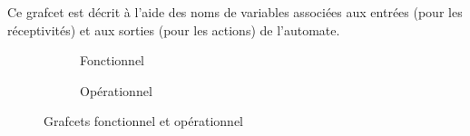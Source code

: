 Ce grafcet est décrit à l'aide des noms de variables associées aux entrées (pour les réceptivités) et aux sorties (pour les actions) de l'automate.


\begin{figure}
  \centering
  \begin{subfigure}[b]{.48\textwidth}
    
    \caption{Fonctionnel}
    \label{fig:grafcetFonct}
  \end{subfigure}
  \begin{subfigure}[b]{.48\textwidth}
    
    \caption{Opérationnel}
    \label{fig:operationnel}
  \end{subfigure}
  \caption{Grafcets fonctionnel et opérationnel}
  \label{fig:fonctionnelVsOperationnel}
\end{figure}
